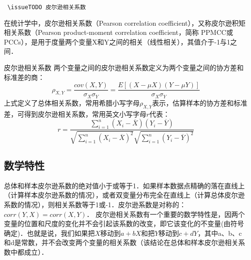 
\verb | \issueTODO 皮尔逊相关系数|

在统计学中，皮尔逊相关系数（Pearson correlation coefficient），又称皮尔逊积矩相关系数（Pearson product-moment correlation coefficient，简称 PPMCC或PCCs），是用于度量两个变量X和Y之间的相关（线性相关），其值介于-1与1之间．
\begin{definition}{皮尔逊相关系数}\label{PearsR_def1}
两个变量之间的皮尔逊相关系数定义为两个变量之间的协方差和标准差的商：
\begin{equation}
\rho_{X,Y}=\frac{cov(X,Y)}{\sigma_{X}\sigma_{Y}}=\frac{E[(X-\mu X)(Y-\mu Y)]}{\sigma_{X}\sigma_{Y}}
\end{equation}
上式定义了总体相关系数，常用希腊小写字母$\rho_{X,Y}$表示，估算样本的协方差和标准差，可得到皮尔逊相关系数，常用英文小写字母$r$代表：
\begin{equation}
r=\frac{\sum_{i=1}^n\left(X_i-\overline X\right)\left(Y_i-\overline Y\right)}{\sqrt{\sum_{i=1}^n\left(X_i-\overline X\right)^2}\sqrt{\sum_{i=1}^n\left(Y_i-\overline Y\right)^2}}
\end{equation}
\end{definition}
\subsection{数学特性}
总体和样本皮尔逊系数的绝对值小于或等于1．如果样本数据点精确的落在直线上（计算样本皮尔逊系数的情况），或者双变量分布完全在直线上（计算总体皮尔逊系数的情况），则相关系数等于1或-1．皮尔逊系数是对称的： $corr(Y,X)=corr(X,Y)$．
皮尔逊相关系数有一个重要的数学特性是，因两个变量的位置和尺度的变化并不会引起该系数的改变，即它该变化的不变量(由符号确定)．也就是说，我们如果把$X$移动到$a+bX$和把$Y$移动到$c+dY$，其中a、b、c和d是常数，并不会改变两个变量的相关系数（该结论在总体和样本皮尔逊相关系数中都成立）．